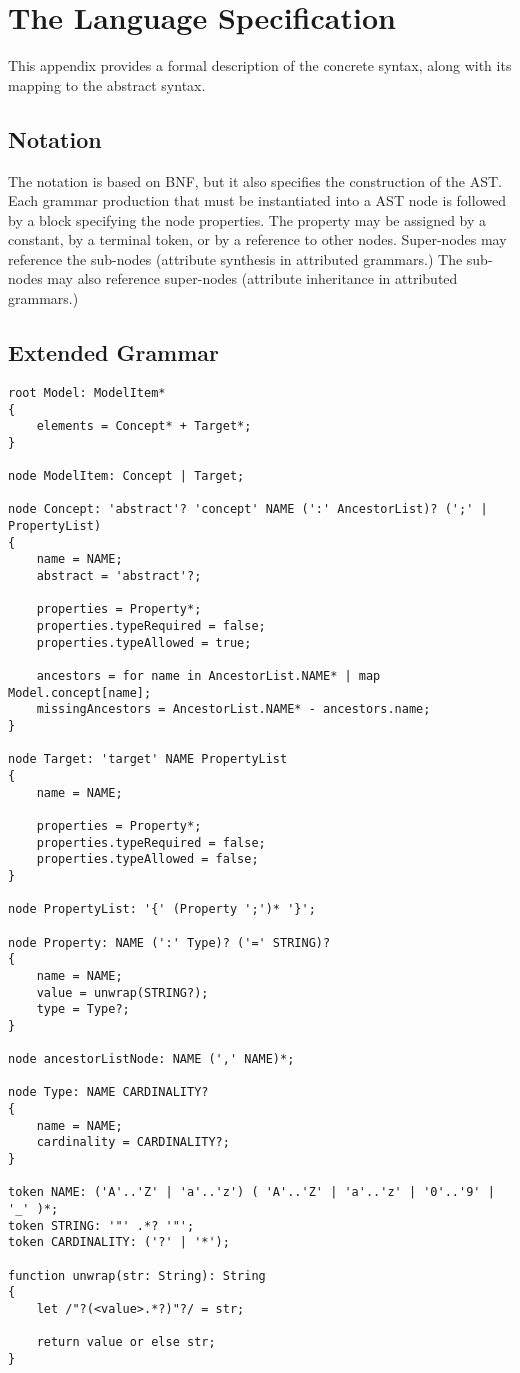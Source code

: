 \section{The Language Specification}\label{sec:spec}
%
This appendix provides a formal description of the concrete syntax, along with its mapping to the abstract syntax.

\subsection{Notation}

The notation is based on BNF, but it also specifies the construction of the AST. Each grammar production that must be instantiated into a AST node is followed by a block specifying the node properties. The property may be assigned by a constant, by a terminal token, or by a reference to other nodes. Super-nodes may reference the sub-nodes (attribute synthesis in attributed grammars.) The sub-nodes may also reference super-nodes (attribute inheritance in attributed grammars.) 

\subsection{Extended Grammar}

\verbatimfont{\tiny}
\begin{verbatim}
root Model: ModelItem*
{
    elements = Concept* + Target*;
}

node ModelItem: Concept | Target;

node Concept: 'abstract'? 'concept' NAME (':' AncestorList)? (';' | PropertyList)
{
    name = NAME;
    abstract = 'abstract'?;

    properties = Property*;
    properties.typeRequired = false;
    properties.typeAllowed = true;

    ancestors = for name in AncestorList.NAME* | map Model.concept[name];
    missingAncestors = AncestorList.NAME* - ancestors.name;
}

node Target: 'target' NAME PropertyList
{
    name = NAME;

    properties = Property*;
    properties.typeRequired = false;
    properties.typeAllowed = false;
}

node PropertyList: '{' (Property ';')* '}';

node Property: NAME (':' Type)? ('=' STRING)?
{
    name = NAME;
    value = unwrap(STRING?);
    type = Type?;
}

node ancestorListNode: NAME (',' NAME)*;

node Type: NAME CARDINALITY?
{
    name = NAME;
    cardinality = CARDINALITY?;
}

token NAME: ('A'..'Z' | 'a'..'z') ( 'A'..'Z' | 'a'..'z' | '0'..'9' | '_' )*;
token STRING: '"' .*? '"';
token CARDINALITY: ('?' | '*');

function unwrap(str: String): String
{
    let /"?(<value>.*?)"?/ = str;

    return value or else str;
}
\end{verbatim}
